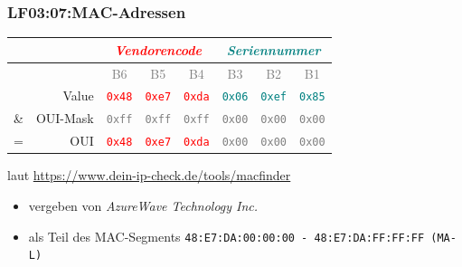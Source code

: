 
\begin{frame}  
  \frametitle{LF03:07:MAC-Adressen}

  \begin{small}
  \begin{center}
    \renewcommand{\arraystretch}{1.5}
    \begin{tabular}{| r  r || c | c | c || c | c | c |}
      \hline
       &  & \multicolumn{3}{c||}{\tiny{\textit{\textrm{\textcolor{red}{Vendorencode}}}}} 
            & \multicolumn{3}{c|}{{\tiny{\textit{\textrm{\textcolor{teal}{Seriennummer}}}}}} \\
      \hline
       &  & \textcolor{gray}{\tiny{B6}} & \textcolor{gray}{\tiny{B5}} & \textcolor{gray}{\tiny{B4}} 
          & \textcolor{gray}{\tiny{B3}} & \textcolor{gray}{\tiny{B2}} & \textcolor{gray}{\tiny{B1}}  \\
      \hline
       & Value & \textcolor{red}{\texttt{0x48}} & \textcolor{red}{\texttt{0xe7}} & \textcolor{red}{\texttt{0xda}}
            & \textcolor{teal}{\texttt{0x06}} & \textcolor{teal}{\texttt{0xef}}  & \textcolor{teal}{\texttt{0x85}} \\
      \hline
      \& & OUI-Mask & \textcolor{gray}{\texttt{0xff}} & \textcolor{gray}{\texttt{0xff}} & \textcolor{gray}{\texttt{0xff}}
            & \textcolor{gray}{\texttt{0x00}} & \textcolor{gray}{\texttt{0x00}}  & \textcolor{gray}{\texttt{0x00}} \\
      \hline
      \hline
      = & OUI & \textcolor{red}{\texttt{0x48}} & \textcolor{red}{\texttt{0xe7}} & \textcolor{red}{\texttt{0xda}}
            & \textcolor{gray}{\texttt{0x00}} & \textcolor{gray}{\texttt{0x00}}  & \textcolor{gray}{\texttt{0x00}} \\
      \hline

    \end{tabular}
  \end{center}
\end{small}
  
\vspace{1cm}
\begin{footnotesize}

laut \href{https://www.dein-ip-check.de/tools/macfinder?oui=48\%3Ae7\%3Ada\%3A06\%3Aef\%3A85}{https://www.dein-ip-check.de/tools/macfinder} 
\begin{itemize}
  \item vergeben von \textit{AzureWave Technology Inc.} 
  \item als Teil des MAC-Segments \texttt{48:E7:DA:00:00:00 - 48:E7:DA:FF:FF:FF (MA-L)}
\end{itemize}
\end{footnotesize}


\end{frame}
